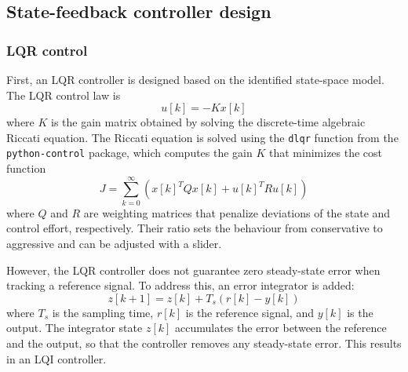 \documentclass[12pt,a4paper]{article}
\begin{document}
\newpage
\subsection{State-feedback controller design}
\subsubsection{LQR control}
\label{sec:lqr}
First, an LQR controller is designed based on the identified state-space model. The LQR control law is
\begin{equation}
u[k] = -K x[k]
\label{eq:lqr}
\end{equation}
where $K$ is the gain matrix obtained by solving the discrete-time algebraic Riccati equation. The Riccati equation is solved using the \texttt{dlqr} function from the \texttt{python-control} package, which computes the gain $K$ that minimizes the cost function
\begin{equation}
J = \sum_{k=0}^{\infty} \left(x[k]^T Q x[k] + u[k]^T R u[k]\right)
\end{equation}
where $Q$ and $R$ are weighting matrices that penalize deviations of the state and control effort, respectively. Their ratio sets the behaviour from conservative to aggressive and can be adjusted with a slider.

However, the LQR controller does not guarantee zero steady-state error when tracking a reference signal. To address this, an error integrator is added:
\begin{equation}
z[k+1] = z[k] + T_s\left(r[k] - y[k]\right)
\label{eq:integrator}
\end{equation}
where $T_s$ is the sampling time, $r[k]$ is the reference signal, and $y[k]$ is the output. The integrator state $z[k]$ accumulates the error between the reference and the output, so that the controller removes any steady-state error. This results in an LQI controller.
\end{document}
